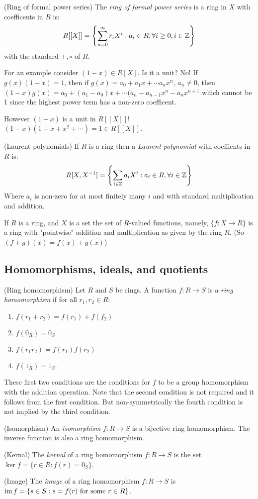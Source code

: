 \documentclass{article}
\begin{document}
\begin{definition}
	(Ring of formal power series) The \textit{ring of formal power series} is a ring in $ X $ with coefficents in $ R $ is:
	\[
	R[[X]]=\left\{\sum_{n=0}^\infty r_iX^i:a_i\in R,\forall i\ge 0, i\in\mathbb{Z}\right\}
	\]
	with the standard $ +,\circ $ of $ R $.
\end{definition}
For an example consider $ (1-x)\in R[X] $. Is it a unit? No! If $ g(x)(1-x)=1 $, then if $ g(x)=a_0+a_1x+\cdots a_nx^n $, $ a_n\ne 0 $, then $ (1-x)g(x) = a_0 + (a_1-a_0)x+\cdots (a_n-a_{n-1}x^n-a_nx^{n+1} $ which cannot be 1 since the highest power term has a non-zero coefficent.\par
However $ (1-x) $ is a unit in $ R[[X]] $! $ (1-x)(1+x+x^2+\cdots)=1\in R[[X]] $.\par
\begin{definition}
	(Laurent polynomials) If $ R $ is a ring then a \textit{Laurent polynomial} with coeffients in $ R $ is:
	\[
		R[X,{X}^{-1}] = \left\{\sum_{i\in\mathbb{Z}}a_iX^i: a_i\in R,\forall i\in\mathbb{Z}\right\}
	\]
	Where $ a_i $ is non-zero for at most finitely many $ i $ and with standard multiplication and addition.
\end{definition}

If $ R $ is a ring, and $ X $ is a set the set of $ R $-valued functions, namely, $ \{f:X\to R\} $ is a ring with "pointwise" addition and multiplication as given by the ring $ R $. (So $ (f+g)(x)=f(x)+g(x) $)
\subsection{Homomorphisms, ideals, and quotients}
\begin{definition}
	(Ring homomorphism) Let $ R $ and $ S $ be rings. A function $ f:R\to S $ is a \textit{ring homomorphism} if for all $ r_1,r_2\in R $:
	\begin{enumerate}
		\item $ f(r_1+r_2)=f(r_1)+f(f_2) $
		\item $ f(0_R)=0_S $
		\item $ f(r_1r_2)=f(r_1)f(r_2) $
		\item $ f(1_R)=1_S $.
	\end{enumerate}
\end{definition}
These first two conditions are the conditions for $ f $ to be a group homomorphism with the addition operation. Note that the second condition is not required and it follows from the first condition. But non-symmetrically the fourth condition is not implied by the third condition.
\begin{definition}
	(Isomorphism) An \textit{isomorphism} $ f:R\to S $ is a bijective ring homomorphism. The inverse function is also a ring homomorphism.
\end{definition}
\begin{definition}
	(Kernal) The \textit{kernal} of a ring homomorphism $ f: R\to S $ is the set $ \ker f = \{r\in R: f(r)=0_S\} $.
\end{definition}
\begin{definition}
	(Image) The \textit{image} of a ring homomorphism $ f: R\to S $ is $ \operatorname{im} f = \{s\in S:s=f(r) \text{ for some } r\in R \}$.
\end{definition}
\end{document}
